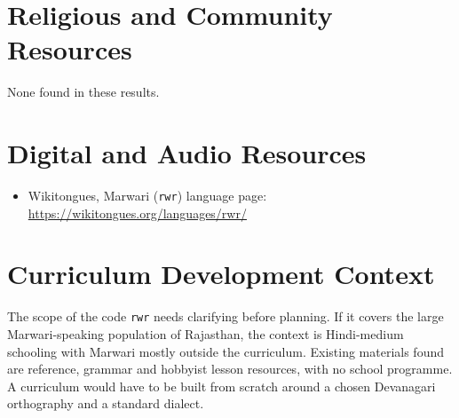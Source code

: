 \documentclass[12pt]{article}
\begin{document}
\section{Religious and Community Resources}
None found in these results.

\section{Digital and Audio Resources}
\begin{itemize}
\item Wikitongues, Marwari (\texttt{rwr}) language page: \url{https://wikitongues.org/languages/rwr/}
\end{itemize}

\section{Curriculum Development Context}
The scope of the code \texttt{rwr} needs clarifying before planning. If it covers the large Marwari-speaking population of Rajasthan, the context is Hindi-medium schooling with Marwari mostly outside the curriculum. Existing materials found are reference, grammar and hobbyist lesson resources, with no school programme. A curriculum would have to be built from scratch around a chosen Devanagari orthography and a standard dialect.
\end{document}

